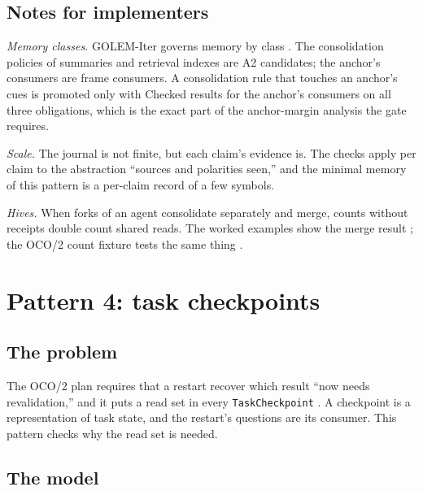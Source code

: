 \documentclass[11pt]{article}
\newcommand{\code}[1]{\texttt{#1}}
\theoremstyle{definition}
\theoremstyle{plain}
\begin{document}
\subsection{Notes for implementers}

\emph{Memory classes.} GOLEM-Iter governs memory by class \cite{golemspec}. The consolidation
policies of summaries and retrieval indexes are A2 candidates; the anchor's consumers are frame
consumers. A consolidation rule that touches an anchor's cues is promoted only with Checked
results for the anchor's consumers on all three obligations, which is the exact part of the
anchor-margin analysis the gate requires.

\emph{Scale.} The journal is not finite, but each claim's evidence is. The checks apply per claim
to the abstraction ``sources and polarities seen,'' and the minimal memory of this pattern is a
per-claim record of a few symbols.

\emph{Hives.} When forks of an agent consolidate separately and merge, counts without receipts
double count shared reads. The worked examples show the merge result \cite[Section~3]{worked}; the
OCO/2 count fixture tests the same thing \cite{oco2}.

\section{Pattern 4: task checkpoints}\label{sec:p4}

\subsection{The problem}

The OCO/2 plan requires that a restart recover which result ``now needs revalidation,'' and it puts a
read set in every \code{TaskCheckpoint} \cite{oco2}. A checkpoint is a representation of task
state, and the restart's questions are its consumer. This pattern checks why the read set is
needed.

\subsection{The model}
\end{document}
